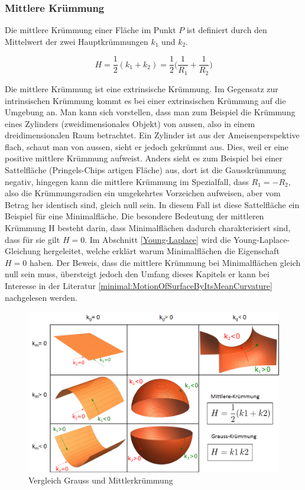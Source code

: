 \begin{refsection}
\subsubsection{Mittlere Krümmung}
Die mittlere Krümmung einer Fläche im Punkt $P$ ist definiert durch den Mittelwert der zwei Hauptkrümmungen $k_1$ und $k_2$.

\begin{equation} \label{Mittlere Kruemmung_D}
  H=\frac{1}{2}(k_1+k_2)= \frac{1}{2}\bigg(\frac{1}{R_1}+\frac{1}{R_2}\bigg)
\end{equation}

Die mittlere Krümmung ist eine extrinsische Krümmung. 
Im Gegensatz zur intrinsischen Krümmung kommt es bei einer extrinsischen Krümmung auf die Umgebung an. 
Man kann sich vorstellen, dass man zum Beispiel die Krümmung eines Zylinders (zweidimensionales Objekt) von aussen, also in einem dreidimensionalen Raum betrachtet. 
Ein Zylinder ist aus der Ameisenperspektive flach, schaut man von aussen, sieht er jedoch gekrümmt aus.
Dies, weil er eine positive mittlere Krümmung aufweist. 
Anders sieht es zum Beispiel bei einer Sattelfläche (Pringels-Chips artigen Fläche) aus, dort ist die Gausskrümmung negativ, hingegen kann die mittlere Krümmung im Spezialfall, dass $R_1=-R_2$, also die Krümmungsradien ein umgekehrtes Vorzeichen aufweisen, aber vom Betrag her identisch sind, gleich null sein. 
In diesem Fall ist diese Sattelfläche ein Beispiel für eine Minimalfläche.
Die besondere Bedeutung der mittleren Krümmung H besteht darin, dass Minimalflächen dadurch charakterisiert sind, dass für sie gilt $H=0$. Im Abschnitt \ref{Young-Laplace} wird die Young-Laplace-Gleichung hergeleitet, welche erklärt warum Minimalflächen die Eigenschaft $H=0$ haben. Der Beweis, dass die mittlere Krümmung bei Minimalflächen gleich null sein muss, übersteigt jedoch den Umfang dieses Kapitels er kann bei Interesse in der Literatur \ref{minimal:MotionOfSurfaceByItsMeanCurvature} nachgelesen werden. 

\begin{figure} 
  \centering
  \includegraphics[scale=0.4]{minimal/Tabelle_Kruemmung.png}
  \caption{Vergleich Grauss und Mittlerkrümmung} 
\end{figure}




\end{refsection}

